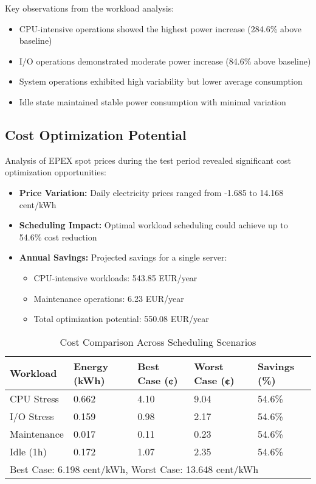 Key observations from the workload analysis:
\begin{itemize}
    \item CPU-intensive operations showed the highest power increase (284.6\% above baseline)
    \item I/O operations demonstrated moderate power increase (84.6\% above baseline)
    \item System operations exhibited high variability but lower average consumption
    \item Idle state maintained stable power consumption with minimal variation
\end{itemize}

\subsection{Cost Optimization Potential}
\label{results:optimization}
Analysis of EPEX spot prices during the test period revealed significant cost optimization opportunities:

\begin{itemize}
    \item \textbf{Price Variation:} Daily electricity prices ranged from -1.685 to 14.168 cent/kWh
    \item \textbf{Scheduling Impact:} Optimal workload scheduling could achieve up to 54.6\% cost reduction
    \item \textbf{Annual Savings:} Projected savings for a single server:
    \begin{itemize}
        \item CPU-intensive workloads: 543.85 EUR/year
        \item Maintenance operations: 6.23 EUR/year
        \item Total optimization potential: 550.08 EUR/year
    \end{itemize}
\end{itemize}

\begin{table}[h]
\caption{Cost Comparison Across Scheduling Scenarios}
\label{tab:cost-comparison}
\begin{tabular}{lllll}
\hline
\textbf{Workload} & \textbf{Energy (kWh)} & \textbf{Best Case (¢)} & \textbf{Worst Case (¢)} & \textbf{Savings (\%)} \\
\hline
CPU Stress & 0.662 & 4.10 & 9.04 & 54.6\% \\
I/O Stress & 0.159 & 0.98 & 2.17 & 54.6\% \\
Maintenance & 0.017 & 0.11 & 0.23 & 54.6\% \\
Idle (1h) & 0.172 & 1.07 & 2.35 & 54.6\% \\
\hline
\multicolumn{5}{l}{\small Best Case: 6.198 cent/kWh, Worst Case: 13.648 cent/kWh} \\
\end{tabular}
\end{table}


